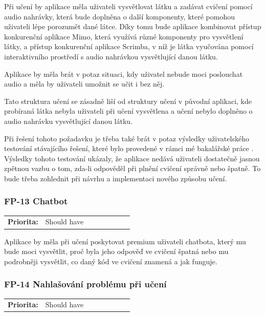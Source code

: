Při učení by aplikace měla uživateli vysvětlovat látku a zadávat cvičení pomocí audio nahrávky, která bude doplněna o další komponenty, které pomohou uživateli lépe porozumět dané látce. Díky tomu bude aplikace kombinovat přístup konkurenční aplikace Mimo, která využívá různé komponenty pro vysvětlení látky, a přístup konkurenční aplikace Scrimba, v níž je látka vyučována pomocí interaktivního prostředí s audio nahrávkou vysvětlující danou látku.

Aplikace by měla brát v potaz situaci, kdy uživatel nebude moci poslouchat audio a měla by uživateli umožnit se učit i bez něj.

Tato struktura učení se zásadně liší od struktury učení v původní aplikaci, kde probíraná látka nebyla uživateli při učení vysvětlena a učení nebylo doplněno o audio nahrávku vysvětlující danou látku.

Při řešení tohoto požadavku je třeba také brát v potaz výsledky uživatelského testování stávajícího řešení, které bylo provedené v rámci mé bakalářské práce \cite{Jenicek2024BachelorThesis}. Výsledky tohoto testování ukázaly, že aplikace nedává uživateli dostatečně jasnou zpětnou vazbu o tom, zda-li odpověděl při plnění cvičení správně nebo špatně. To bude třeba zohlednit při návrhu a implementaci nového způsobu učení.

\subsubsection{FP-13 Chatbot}

\begin{tabular}{lp{0.7\linewidth}}
    \textbf{Priorita:} & Should have \\
\end{tabular}

Aplikace by měla při učení poskytovat premium uživateli chatbota, který mu bude moci vysvětlit, proč byla jeho odpověď ve cvičení špatná nebo mu podrobněji vysvětlit, co daný kód ve cvičení znamená a jak funguje.

\subsubsection{FP-14 Nahlašování problému při učení}

\begin{tabular}{lp{0.7\linewidth}}
    \textbf{Priorita:} & Should have \\
\end{tabular}

